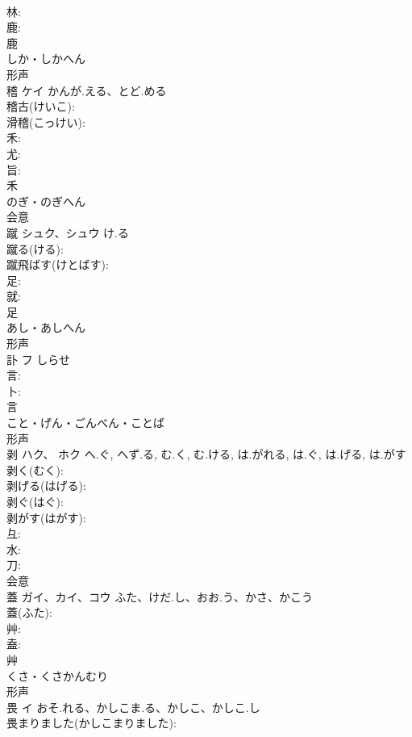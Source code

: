 \documentclass[8pt]{extreport}
\begin{document}
\begin{CJK}{UTF8}{min}
\\	林: 
\\	鹿: 
\\	鹿	
\\	しか・しかへん	
\\	形声 
\\	稽	ケイ	かんが.える、とど.める		
\\	稽古(けいこ): 
\\	滑稽(こっけい): 
\\	禾: 
\\	尤: 
\\	旨: 
\\	禾	
\\	のぎ・のぎへん	
\\	会意 
\\	蹴	シュク、シュウ	け.る		
\\	蹴る(ける): 
\\	蹴飛ばす(けとばす): 
\\	足: 
\\	就: 
\\	足	
\\	あし・あしへん	
\\	形声 
\\	訃	フ	しらせ		
\\	言: 
\\	卜: 
\\	言	
\\	こと・げん・ごんべん・ことば	
\\	形声 
\\	剥	ハク、 ホク	へ.ぐ, へず.る, む.く, む.ける, は.がれる, は.ぐ, は.げる, は.がす		
\\	剥く(むく): 
\\	剥げる(はげる): 
\\	剥ぐ(はぐ): 
\\	剥がす(はがす): 
\\	彑: 
\\	水: 
\\	刀: 
\\	会意 
\\	蓋	ガイ、カイ、コウ	ふた、けだ.し、おお.う、かさ、かこう		
\\	蓋(ふた): 
\\	艸: 
\\	盍: 
\\	艸	
\\	くさ・くさかんむり	
\\	形声 
\\	畏	イ	おそ.れる、かしこま.る、かしこ、かしこ.し		
\\	畏まりました(かしこまりました): 

\end{CJK}
\end{document}
